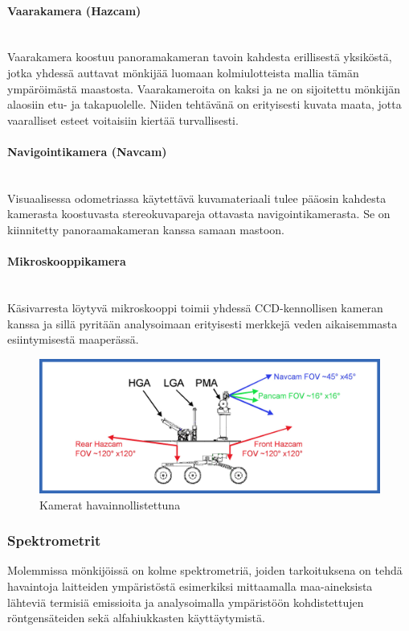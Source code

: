 \documentclass[finnish]{tktltiki2}
\theoremstyle{definition}
\theoremstyle{remark}
\begin{document}
\paragraph{Vaarakamera (Hazcam)}\mbox{} \\
Vaarakamera koostuu panoramakameran tavoin kahdesta erillisestä yksiköstä, jotka yhdessä auttavat mönkijää luomaan kolmiulotteista mallia tämän ympäröimästä maastosta. Vaarakameroita on kaksi ja ne on sijoitettu mönkijän alaosiin etu- ja takapuolelle. Niiden tehtävänä on erityisesti kuvata maata, jotta vaaralliset esteet voitaisiin kiertää turvallisesti.\cite{cams}

\paragraph{Navigointikamera (Navcam)}\mbox{} \\
Visuaalisessa odometriassa käytettävä kuvamateriaali tulee pääosin kahdesta kamerasta koostuvasta stereokuvapareja ottavasta navigointikamerasta. Se on kiinnitetty panoraamakameran kanssa samaan mastoon.\cite{cams}

\paragraph{Mikroskooppikamera}\mbox{} \\
Käsivarresta löytyvä mikroskooppi toimii yhdessä CCD-kennollisen kameran kanssa ja sillä pyritään analysoimaan erityisesti merkkejä veden aikaisemmasta esiintymisestä maaperässä.\cite{microscope}

\begin{figure}[H]
	\caption{Kamerat havainnollistettuna \cite{cams}}
	\centering
		\includegraphics[width=1.0\textwidth]{cams}
\end{figure}

\subsubsection{Spektrometrit}
Molemmissa mönkijöissä on kolme spektrometriä, joiden tarkoituksena on tehdä havaintoja laitteiden ympäristöstä esimerkiksi mittaamalla maa-aineksista lähteviä termisiä emissioita ja analysoimalla ympäristöön kohdistettujen röntgensäteiden sekä alfahiukkasten käyttäytymistä.\cite{spectrometers}
\end{document}
